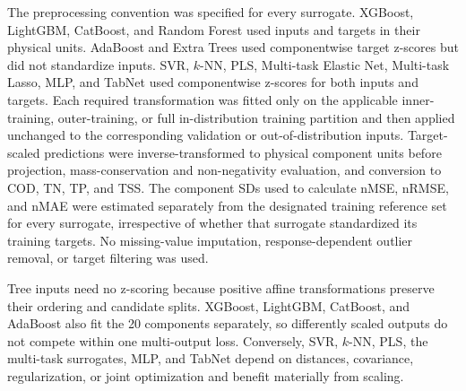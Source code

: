 \documentclass[a4paper,fleqn]{cas-sc}
\begin{document}
The preprocessing convention was specified for every surrogate. XGBoost, LightGBM, CatBoost, and Random Forest used inputs and targets in their physical units. AdaBoost and Extra Trees used componentwise target z-scores but did not standardize inputs. SVR, $k$-NN, PLS, Multi-task Elastic Net, Multi-task Lasso, MLP, and TabNet used componentwise z-scores for both inputs and targets. Each required transformation was fitted only on the applicable inner-training, outer-training, or full in-distribution training partition and then applied unchanged to the corresponding validation or out-of-distribution inputs. Target-scaled predictions were inverse-transformed to physical component units before projection, mass-conservation and non-negativity evaluation, and conversion to COD, TN, TP, and TSS. The component SDs used to calculate nMSE, nRMSE, and nMAE were estimated separately from the designated training reference set for every surrogate, irrespective of whether that surrogate standardized its training targets. No missing-value imputation, response-dependent outlier removal, or target filtering was used.

Tree inputs need no z-scoring because positive affine transformations preserve their ordering and candidate splits. XGBoost, LightGBM, CatBoost, and AdaBoost also fit the 20 components separately, so differently scaled outputs do not compete within one multi-output loss. Conversely, SVR, $k$-NN, PLS, the multi-task surrogates, MLP, and TabNet depend on distances, covariance, regularization, or joint optimization and benefit materially from scaling.
\end{document}
